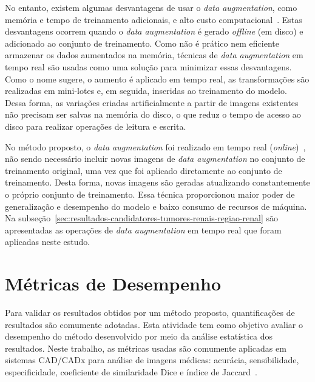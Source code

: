 No entanto, existem algumas desvantagens de usar o \textit{data augmentation}, como memória e tempo de treinamento adicionais, e alto custo computacional~\cite{shorten2019survey}. Estas desvantagens ocorrem quando o \textit{data augmentation} é gerado \textit{offline} (em disco) e adicionado ao conjunto de treinamento. Como não é prático nem eficiente armazenar os dados aumentados na memória, técnicas de \textit{data augmentation} em tempo real são usadas como uma solução para minimizar essas desvantagens. Como o nome sugere, o aumento é aplicado em tempo real, as transformações são realizadas em mini-lotes e, em seguida, inseridas ao treinamento do modelo. Dessa forma, as variações criadas artificialmente a partir de imagens existentes não precisam ser salvas na memória do disco, o que reduz o tempo de acesso ao disco para realizar operações de leitura e escrita.

No método proposto, o \textit{data augmentation} foi realizado em tempo real (\textit{online})~\cite{shorten2019survey}, não sendo necessário incluir novas imagens de \textit{data augmentation} no conjunto de treinamento original, uma vez que foi aplicado diretamente ao conjunto de treinamento. Desta forma, novas imagens são geradas atualizando constantemente o próprio conjunto de treinamento. Essa técnica proporcionou maior poder de generalização e desempenho do modelo e baixo consumo de recursos de máquina. Na subseção~\ref{sec:resultados-candidatores-tumores-renais-regiao-renal} são apresentadas as operações de \textit{data augmentation} em tempo real que foram aplicadas neste estudo.

\section{Métricas de Desempenho}
\label{sec:metricas-de-desempenho}

Para validar os resultados obtidos por um método proposto, quantificações de resultados são comumente adotadas. Esta atividade tem como objetivo avaliar o desempenho do método desenvolvido por meio da análise estatística dos resultados. Neste trabalho, as métricas usadas são comumente aplicadas em sistemas CAD/CADx para análise de imagens médicas: acurácia, sensibilidade, especificidade, coeficiente de similaridade Dice e índice de Jaccard~\cite{taha2015metrics, bland2015introduction}.


